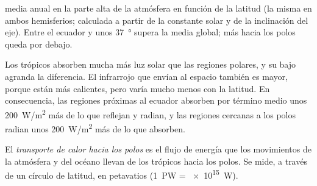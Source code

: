 \begin{omfigure}

{\small {} media anual en la parte alta de la atmósfera en función
de la latitud (la misma en ambos hemisferios; calculada a partir de la
constante solar y de la inclinación del eje). Entre el ecuador y unos
\qty{37}{\degree} supera la media global; más hacia los polos queda por
debajo.}
\end{omfigure}

Los trópicos absorben mucha más luz solar que las regiones polares, y su
bajo  agranda la diferencia. El infrarrojo que envían al espacio
también es mayor, porque están más calientes, pero varía mucho menos con la
latitud. En consecuencia, las regiones próximas al ecuador absorben por
término medio unos \qty{200}{W/m^2} más de lo que reflejan y radian, y las
regiones cercanas a los polos radian unos \qty{200}{W/m^2} más de lo que
absorben.

\begin{definition}\label{def:g10:earth-energy-budget:heat-transport}
El \emph{transporte de calor hacia los polos}
es el flujo de energía que los movimientos de la atmósfera y del océano
llevan de los trópicos hacia los polos. Se mide, a través de un círculo de
latitud, en petavatios (\qty{1}{PW} = \qty{e15}{W}).
\end{definition}


